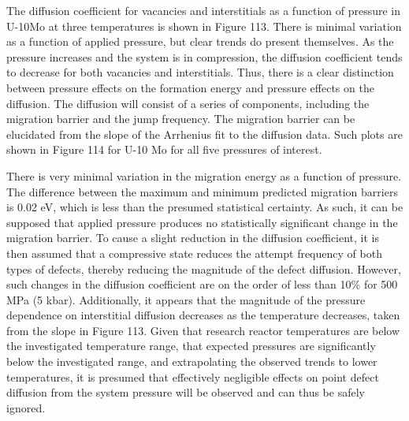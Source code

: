 \documentclass[default]{sn-jnl}%
\begin{document}
The diffusion coefficient for vacancies and interstitials as a function of pressure in U-10Mo at three temperatures is shown in Figure 113. There is minimal variation as a function of applied pressure, but clear trends do present themselves. As the pressure increases and the system is in compression, the diffusion coefficient tends to decrease for both vacancies and interstitials. Thus, there is a clear distinction between pressure effects on the formation energy and pressure effects on the diffusion. The diffusion will consist of a series of components, including the migration barrier and the jump frequency.  The migration barrier can be elucidated from the slope of the Arrhenius fit to the diffusion data. Such plots are shown in Figure 114 for U-10 Mo for all five pressures of interest. 

There is very minimal variation in the migration energy as a function of pressure. The difference between the maximum and minimum predicted migration barriers is 0.02 eV, which is less than the presumed statistical certainty. As such, it can be supposed that applied pressure produces no statistically significant change in the migration barrier. To cause a slight reduction in the diffusion coefficient, it is then assumed that a compressive state reduces the attempt frequency of both types of defects, thereby reducing the magnitude of the defect diffusion. However, such changes in the diffusion coefficient are on the order of less than 10\% for 500 MPa (5 kbar). Additionally, it appears that the magnitude of the pressure dependence on interstitial diffusion decreases as the temperature decreases, taken from the slope in Figure 113. Given that research reactor temperatures are below the investigated temperature range, that expected pressures are significantly below the investigated range, and extrapolating the observed trends to lower temperatures, it is presumed that effectively negligible effects on point defect diffusion from the system pressure will be observed and can thus be safely ignored. 
\end{document}
